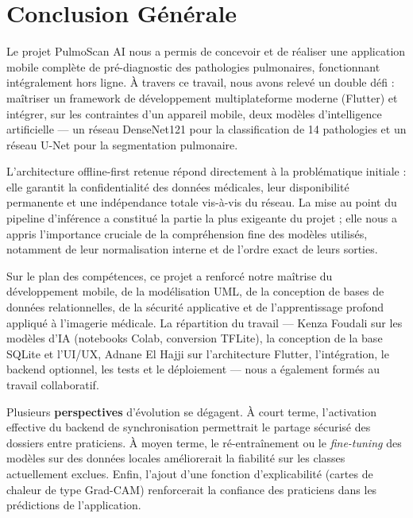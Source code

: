\documentclass[12pt,a4paper]{report}
\begin{document}
\chapter*{Conclusion Générale}

Le projet PulmoScan AI nous a permis de concevoir et de réaliser une application mobile complète de pré-diagnostic des pathologies pulmonaires, fonctionnant intégralement hors ligne. À travers ce travail, nous avons relevé un double défi : maîtriser un framework de développement multiplateforme moderne (Flutter) et intégrer, sur les contraintes d'un appareil mobile, deux modèles d'intelligence artificielle --- un réseau DenseNet121 pour la classification de 14 pathologies et un réseau U-Net pour la segmentation pulmonaire.

\bigskip
L'architecture offline-first retenue répond directement à la problématique initiale : elle garantit la confidentialité des données médicales, leur disponibilité permanente et une indépendance totale vis-à-vis du réseau. La mise au point du pipeline d'inférence a constitué la partie la plus exigeante du projet ; elle nous a appris l'importance cruciale de la compréhension fine des modèles utilisés, notamment de leur normalisation interne et de l'ordre exact de leurs sorties.

\bigskip
Sur le plan des compétences, ce projet a renforcé notre maîtrise du développement mobile, de la modélisation UML, de la conception de bases de données relationnelles, de la sécurité applicative et de l'apprentissage profond appliqué à l'imagerie médicale. La répartition du travail --- Kenza Foudali sur les modèles d'IA (notebooks Colab, conversion TFLite), la conception de la base SQLite et l'UI/UX, Adnane El Hajji sur l'architecture Flutter, l'intégration, le backend optionnel, les tests et le déploiement --- nous a également formés au travail collaboratif.

\bigskip
Plusieurs \textbf{perspectives} d'évolution se dégagent. À court terme, l'activation effective du backend de synchronisation permettrait le partage sécurisé des dossiers entre praticiens. À moyen terme, le ré-entraînement ou le \textit{fine-tuning} des modèles sur des données locales améliorerait la fiabilité sur les classes actuellement exclues. Enfin, l'ajout d'une fonction d'explicabilité (cartes de chaleur de type Grad-CAM) renforcerait la confiance des praticiens dans les prédictions de l'application.
\end{document}

